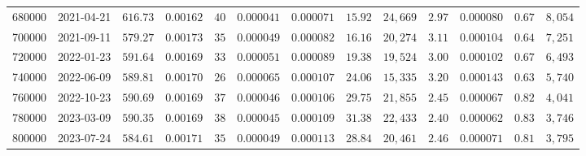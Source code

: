 \begin{tabular}{rllllllllllll}
680000 & 2021-04-21 & $616.73$ & $0.00162$ & $40$ & $0.000041$ & $0.000071$ & $15.92$ & $24,669$ & $2.97$ & $0.000080$ & $0.67$ & $8,054$ \\
700000 & 2021-09-11 & $579.27$ & $0.00173$ & $35$ & $0.000049$ & $0.000082$ & $16.16$ & $20,274$ & $3.11$ & $0.000104$ & $0.64$ & $7,251$ \\
720000 & 2022-01-23 & $591.64$ & $0.00169$ & $33$ & $0.000051$ & $0.000089$ & $19.38$ & $19,524$ & $3.00$ & $0.000102$ & $0.67$ & $6,493$ \\
740000 & 2022-06-09 & $589.81$ & $0.00170$ & $26$ & $0.000065$ & $0.000107$ & $24.06$ & $15,335$ & $3.20$ & $0.000143$ & $0.63$ & $5,740$ \\
760000 & 2022-10-23 & $590.69$ & $0.00169$ & $37$ & $0.000046$ & $0.000106$ & $29.75$ & $21,855$ & $2.45$ & $0.000067$ & $0.82$ & $4,041$ \\
780000 & 2023-03-09 & $590.35$ & $0.00169$ & $38$ & $0.000045$ & $0.000109$ & $31.38$ & $22,433$ & $2.40$ & $0.000062$ & $0.83$ & $3,746$ \\
800000 & 2023-07-24 & $584.61$ & $0.00171$ & $35$ & $0.000049$ & $0.000113$ & $28.84$ & $20,461$ & $2.46$ & $0.000071$ & $0.81$ & $3,795$ \\
\bottomrule
\end{tabular}
